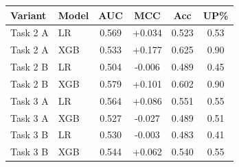 \begin{tabular}{@{}l l c c c c@{}}
\toprule
\textbf{Variant} & \textbf{Model} & \textbf{AUC} & \textbf{MCC} & \textbf{Acc} & \textbf{UP\%} \\
\midrule
Task 2 A & LR & 0.569 & +0.034 & 0.523 & 0.53 \\
Task 2 A & XGB & 0.533 & +0.177 & 0.625 & 0.90 \\
Task 2 B & LR & 0.504 & -0.006 & 0.489 & 0.45 \\
Task 2 B & XGB & 0.579 & +0.101 & 0.602 & 0.90 \\
Task 3 A & LR & 0.564 & +0.086 & 0.551 & 0.55 \\
Task 3 A & XGB & 0.527 & -0.027 & 0.489 & 0.51 \\
Task 3 B & LR & 0.530 & -0.003 & 0.483 & 0.41 \\
Task 3 B & XGB & 0.544 & +0.062 & 0.540 & 0.55 \\
\bottomrule
\end{tabular}
